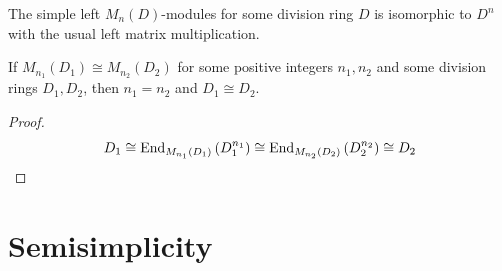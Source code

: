 \begin{lemma}
    \label{lem:simple module over matrix ring}
    The simple left $M_n(D)$-modules for some division ring $D$ is isomorphic to $D^n$ with the usual left matrix multiplication.
\end{lemma}

\begin{proposition}
    If $M_{n_1}(D_1)\cong M_{n_2}(D_2)$ for some positive integers $n_1,n_2$ and some division rings $D_1,D_2$, then $n_1=n_2$ and $D_1\cong D_2$.
    \begin{proof}
        \begin{equation*}
            D_1
            \cong
            \operatorname{\operatorname{End}}_{M_{n_1}(D_1)}\left( D_1^{n_1} \right)
            \cong
            \operatorname{\operatorname{End}}_{M_{n_2}(D_2)}\left( D_2^{n_2} \right)
            \cong
            D_2
        \end{equation*}
    \end{proof}
\end{proposition}





\section{Semisimplicity}

